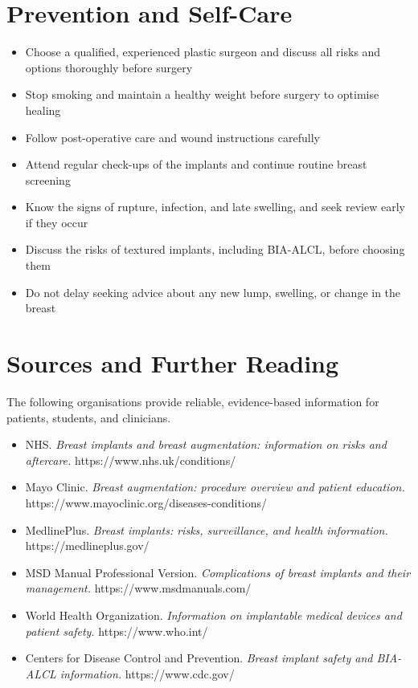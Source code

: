 \section*{Prevention and Self-Care}
\begin{itemize}
    \item Choose a qualified, experienced plastic surgeon and discuss all risks and options thoroughly before surgery
    \item Stop smoking and maintain a healthy weight before surgery to optimise healing
    \item Follow post-operative care and wound instructions carefully
    \item Attend regular check-ups of the implants and continue routine breast screening
    \item Know the signs of rupture, infection, and late swelling, and seek review early if they occur
    \item Discuss the risks of textured implants, including BIA-ALCL, before choosing them
    \item Do not delay seeking advice about any new lump, swelling, or change in the breast
\end{itemize}

\section*{Sources and Further Reading}
The following organisations provide reliable, evidence-based information for patients, students, and clinicians.

\begin{itemize}
    \item NHS. \textit{Breast implants and breast augmentation: information on risks and aftercare.} https://www.nhs.uk/conditions/
    \item Mayo Clinic. \textit{Breast augmentation: procedure overview and patient education.} https://www.mayoclinic.org/diseases-conditions/
    \item MedlinePlus. \textit{Breast implants: risks, surveillance, and health information.} https://medlineplus.gov/
    \item MSD Manual Professional Version. \textit{Complications of breast implants and their management.} https://www.msdmanuals.com/
    \item World Health Organization. \textit{Information on implantable medical devices and patient safety.} https://www.who.int/
    \item Centers for Disease Control and Prevention. \textit{Breast implant safety and BIA-ALCL information.} https://www.cdc.gov/
\end{itemize}
